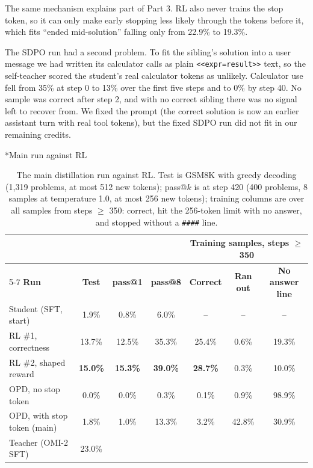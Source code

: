 \documentclass[11pt]{article}
\makeatletter
\renewcommand\subsection{\@startsection{subsection}{2}{\z@}{0.6em}{0.2em}{\normalsize\bfseries}}
\newcommand{\code}[1]{\texttt{#1}}
\makeatother
\begin{document}
The same mechanism explains part of Part 3. RL also never trains the stop token, so it can only make early stopping less likely through the tokens before it, which fits ``ended mid-solution'' falling only from 22.9\% to 19.3\%.

The SDPO run had a second problem. To fit the sibling's solution into a user message we had written its calculator calls as plain \code{<<expr=result>>} text, so the self-teacher scored the student's real calculator tokens as unlikely. Calculator use fell from 35\% at step 0 to 13\% over the first five steps and to 0\% by step 40. No sample was correct after step 2, and with no correct sibling there was no signal left to recover from. We fixed the prompt (the correct solution is now an earlier assistant turn with real tool tokens), but the fixed SDPO run did not fit in our remaining credits.

\subsection*{Main run against RL}

\begin{table}[H]
\centering
\small
\renewcommand{\arraystretch}{1.15}
\caption{The main distillation run against RL. Test is GSM8K with greedy decoding (1,319 problems, at most 512 new tokens); pass@$k$ is at step 420 (400 problems, 8 samples at temperature 1.0, at most 256 new tokens); training columns are over all samples from steps $\geq$ 350: correct, hit the 256-token limit with no answer, and stopped without a \code{\#\#\#\#} line.}\label{tab:part5main}
\setlength{\tabcolsep}{4pt}
\begin{tabular}{l c cc ccc}
\toprule
 & & & & \multicolumn{3}{c}{\textbf{Training samples, steps $\geq$ 350}} \\
\cmidrule(lr){5-7}
\textbf{Run} & \textbf{Test} & \textbf{pass@1} & \textbf{pass@8} & \textbf{Correct} & \textbf{Ran out} & \textbf{No answer line} \\
\midrule
Student (SFT, start) & 1.9\% & 0.8\% & 6.0\% & -- & -- & -- \\
RL \#1, correctness & 13.7\% & 12.5\% & 35.3\% & 25.4\% & 0.6\% & 19.3\% \\
RL \#2, shaped reward & \textbf{15.0\%} & \textbf{15.3\%} & \textbf{39.0\%} & \textbf{28.7\%} & 0.3\% & 10.0\% \\
OPD, no stop token & 0.0\% & 0.0\% & 0.3\% & 0.1\% & 0.9\% & 98.9\% \\
OPD, with stop token (main) & 1.8\% & 1.0\% & 13.3\% & 3.2\% & 42.8\% & 30.9\% \\
Teacher (OMI-2 SFT) & 23.0\% & & & & & \\
\bottomrule
\end{tabular}
\end{table}
\end{document}
